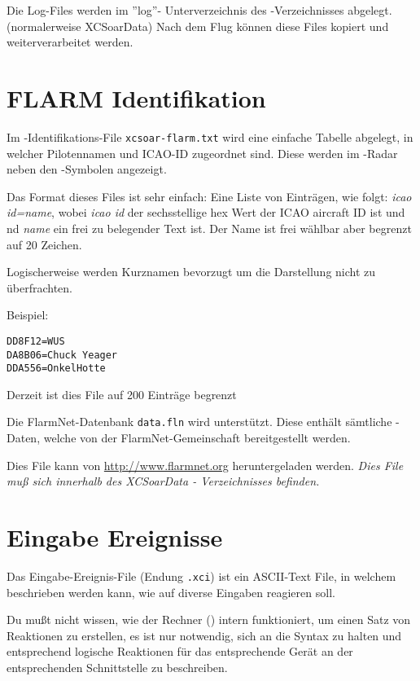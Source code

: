 Die Log-Files werden  im ''log''- Unterverzeichnis des \xc -Verzeichnisses abgelegt. (normalerweise XCSoarData)
Nach dem Flug können diese Files kopiert und weiterverarbeitet werden.


\section{FLARM Identifikation}\label{sec:flarm-ident-file}

Im  \fl-Identifikations-File  \verb|xcsoar-flarm.txt| wird eine einfache Tabelle
abgelegt, in welcher Pilotennamen und ICAO-ID zugeordnet sind.
Diese werden im \fl-Radar neben den \fl-Symbolen angezeigt.

Das Format dieses Files ist sehr einfach: Eine Liste von Einträgen, wie folgt:
{\em icao id=name}, wobei {\em icao id} der sechsstellige hex Wert der ICAO
aircraft ID ist und  nd {\em name} ein frei zu belegender Text ist.
Der Name ist frei wählbar aber  begrenzt auf 20 Zeichen.

Logischerweise werden Kurznamen bevorzugt um die Darstellung nicht zu überfrachten.

Beispiel:
\begin{verbatim}
DD8F12=WUS
DA8B06=Chuck Yeager
DDA556=OnkelHotte
\end{verbatim}

Derzeit ist dies File auf 200 Einträge begrenzt

Die  FlarmNet-Datenbank \verb|data.fln| wird unterstützt.
Diese enthält sämtliche \fl-Daten, welche von der \textsf{\textsf{FlarmNet}}-Gemeinschaft bereitgestellt werden.

Dies File kann von  \url{http://www.flarmnet.org}  heruntergeladen werden.
\textsl{Dies File muß sich innerhalb des XCSoarData - Verzeichnisses befinden.}


\section{Eingabe Ereignisse}

Das Eingabe-Ereignis-File  (Endung \verb|.xci|) ist ein ASCII-Text File,
in welchem beschrieben werden kann, wie  \xc auf diverse Eingaben reagieren soll.

Du mußt nicht wissen, wie der Rechner (\xc) intern funktioniert, um einen Satz von
Reaktionen zu erstellen, es ist nur notwendig, sich an die Syntax zu halten und entsprechend logische
Reaktionen für das entsprechende Gerät an der entsprechenden Schnittstelle zu beschreiben.

